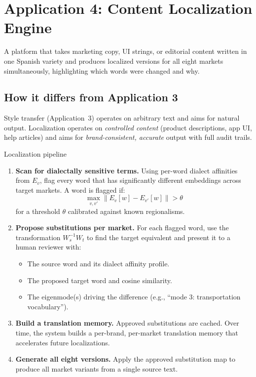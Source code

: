 \documentclass[11pt,a4paper]{article}
\begin{document}
\section{Application 4: Content Localization Engine}
\label{sec:app-localization}

\begin{appbox}
A platform that takes marketing copy, UI strings, or editorial
content written in one Spanish variety and produces localized
versions for all eight markets simultaneously, highlighting which
words were changed and why.
\end{appbox}

\subsection{How it differs from Application 3}

Style transfer (Application~3) operates on arbitrary text and aims for
natural output. Localization operates on \emph{controlled content}
(product descriptions, app UI, help articles) and aims for
\emph{brand-consistent, accurate} output with full audit trails.

\begin{howbox}{Localization pipeline}
\begin{enumerate}[nosep]
  \item \textbf{Scan for dialectally sensitive terms.} Using per-word
    dialect affinities from $E_v$, flag every word that has
    significantly different embeddings across target markets. A word
    is flagged if:
    \[
    \max_{v, v'} \|E_v[w] - E_{v'}[w]\| > \theta
    \]
    for a threshold $\theta$ calibrated against known regionalisms.

  \item \textbf{Propose substitutions per market.} For each flagged
    word, use the transformation $W_s^{-1} W_t$ to find the target
    equivalent and present it to a human reviewer with:
    \begin{itemize}[nosep]
      \item The source word and its dialect affinity profile.
      \item The proposed target word and cosine similarity.
      \item The eigenmode(s) driving the difference (e.g., ``mode 3:
            transportation vocabulary'').
    \end{itemize}

  \item \textbf{Build a translation memory.} Approved substitutions
    are cached. Over time, the system builds a per-brand, per-market
    translation memory that accelerates future localizations.

  \item \textbf{Generate all eight versions.} Apply the approved
    substitution map to produce all market variants from a single
    source text.
\end{enumerate}
\end{howbox}
\end{document}

